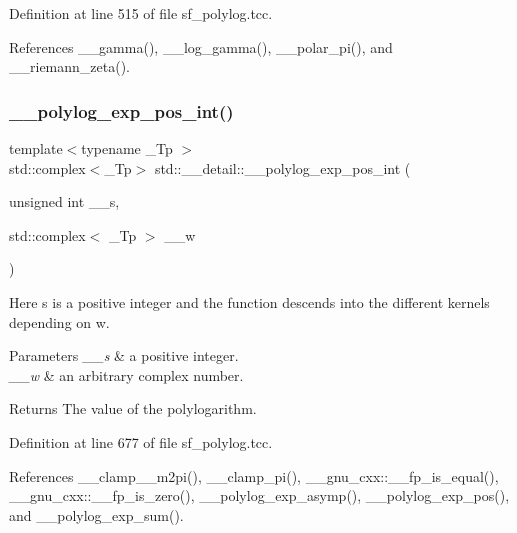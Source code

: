 Definition at line 515 of file sf\+\_\+polylog.\+tcc.



References \+\_\+\+\_\+gamma(), \+\_\+\+\_\+log\+\_\+gamma(), \+\_\+\+\_\+polar\+\_\+pi(), and \+\_\+\+\_\+riemann\+\_\+zeta().

\mbox{\label{namespacestd_1_1____detail_a84081b0dd494f4601f2d40768e71b7b4}} 
\subsubsection{\texorpdfstring{\+\_\+\+\_\+polylog\+\_\+exp\+\_\+pos\+\_\+int()}{\_\_polylog\_exp\_pos\_int()}\hspace{0.1cm}{\footnotesize\ttfamily [1/2]}}
{\footnotesize\ttfamily template$<$typename \+\_\+\+Tp $>$ \\
std\+::complex$<$\+\_\+\+Tp$>$ std\+::\+\_\+\+\_\+detail\+::\+\_\+\+\_\+polylog\+\_\+exp\+\_\+pos\+\_\+int (\begin{DoxyParamCaption}\item[{unsigned int}]{\+\_\+\+\_\+s,  }\item[{std\+::complex$<$ \+\_\+\+Tp $>$}]{\+\_\+\+\_\+w }\end{DoxyParamCaption})}

Here s is a positive integer and the function descends into the different kernels depending on w.


\begin{DoxyParams}{Parameters}
{\em \+\_\+\+\_\+s} & a positive integer. \\
\hline
{\em \+\_\+\+\_\+w} & an arbitrary complex number. \\
\hline
\end{DoxyParams}
\begin{DoxyReturn}{Returns}
The value of the polylogarithm. 
\end{DoxyReturn}


Definition at line 677 of file sf\+\_\+polylog.\+tcc.



References \+\_\+\+\_\+clamp\+\_\+\_\+m2pi(), \+\_\+\+\_\+clamp\+\_\+pi(), \+\_\+\+\_\+gnu\+\_\+cxx\+::\+\_\+\+\_\+fp\+\_\+is\+\_\+equal(), \+\_\+\+\_\+gnu\+\_\+cxx\+::\+\_\+\+\_\+fp\+\_\+is\+\_\+zero(), \+\_\+\+\_\+polylog\+\_\+exp\+\_\+asymp(), \+\_\+\+\_\+polylog\+\_\+exp\+\_\+pos(), and \+\_\+\+\_\+polylog\+\_\+exp\+\_\+sum().



